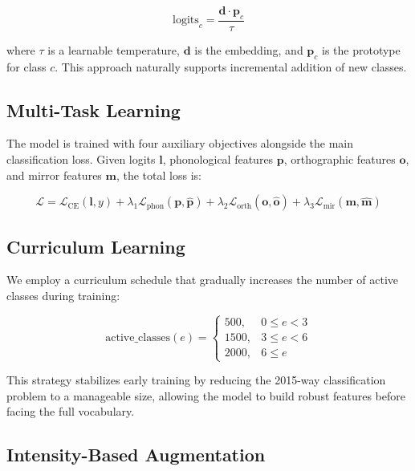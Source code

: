 \documentclass[conference]{IEEEtran}
\begin{document}
\begin{equation}
\text{logits}_c = \frac{\mathbf{d} \cdot \mathbf{p}_c}{\tau}
\end{equation}

where $\tau$ is a learnable temperature, $\mathbf{d}$ is the embedding, and $\mathbf{p}_c$ is the prototype for class $c$. This approach naturally supports incremental addition of new classes.

\subsection{Multi-Task Learning}

The model is trained with four auxiliary objectives alongside the main classification loss. Given logits $\mathbf{l}$, phonological features $\mathbf{p}$, orthographic features $\mathbf{o}$, and mirror features $\mathbf{m}$, the total loss is:

\begin{equation}
\mathcal{L} = \mathcal{L}_{\text{CE}}(\mathbf{l}, y) + \lambda_1 \mathcal{L}_{\text{phon}}(\mathbf{p}, \hat{\mathbf{p}}) + \lambda_2 \mathcal{L}_{\text{orth}}(\mathbf{o}, \hat{\mathbf{o}}) + \lambda_3 \mathcal{L}_{\text{mir}}(\mathbf{m}, \hat{\mathbf{m}})
\end{equation}

\subsection{Curriculum Learning}

We employ a curriculum schedule that gradually increases the number of active classes during training:

\begin{equation}
\text{active\_classes}(e) = 
\begin{cases}
500, & 0 \leq e < 3 \\
1500, & 3 \leq e < 6 \\
2000, & 6 \leq e
\end{cases}
\end{equation}

This strategy stabilizes early training by reducing the 2015-way classification problem to a manageable size, allowing the model to build robust features before facing the full vocabulary.

\subsection{Intensity-Based Augmentation}
\end{document}
